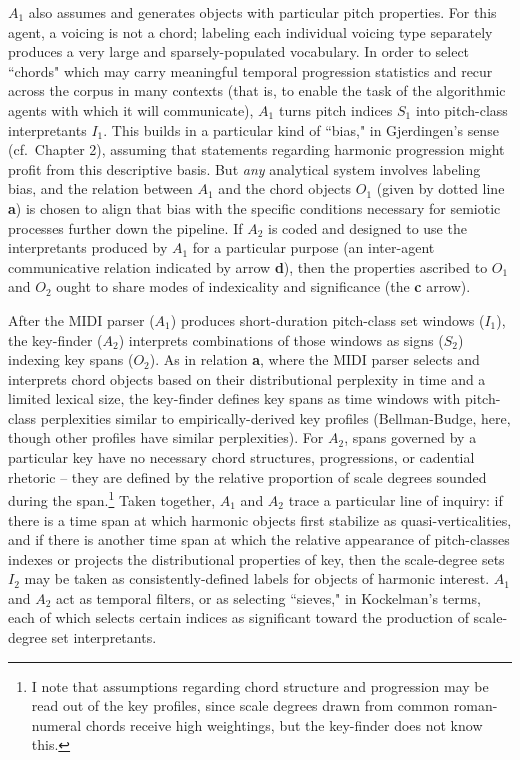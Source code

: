 $A_1$ also assumes and generates objects with particular pitch properties.  For this agent, a voicing is not a chord; labeling each individual voicing type separately produces a very large and sparsely-populated vocabulary.  In order to select ``chords"  which may carry meaningful temporal progression statistics and recur across the corpus in many contexts (that is, to enable the task of the algorithmic agents with which it will communicate), $A_1$ turns pitch indices $S_1$ into pitch-class interpretants $I_1$.  This builds in a particular kind of ``bias," in Gjerdingen's sense (cf.\ Chapter 2), assuming that statements regarding harmonic progression might profit from this descriptive basis.  But \emph{any} analytical system involves labeling bias, and the relation between $A_1$ and the chord objects $O_1$ (given by dotted line \textbf{a}) is chosen to align that bias with the specific conditions necessary for semiotic processes further down the pipeline.  If $A_2$ is coded and designed to use the interpretants produced by $A_1$ for a particular purpose (an inter-agent communicative relation indicated by arrow \textbf{d}), then the properties ascribed to $O_1$ and $O_2$ ought to share modes of indexicality and significance (the \textbf{c} arrow).

After the MIDI parser ($A_1$) produces short-duration pitch-class set windows ($I_1$), the key-finder ($A_2$) interprets combinations of those windows as signs ($S_2$) indexing key spans ($O_2$).  As in relation \textbf{a}, where the MIDI parser selects and interprets chord objects based on their distributional perplexity in time and a limited lexical size, the key-finder defines key spans as time windows with pitch-class perplexities similar to empirically-derived key profiles (Bellman-Budge, here, though other profiles have similar perplexities).  For $A_2$, spans governed by a particular key have no necessary chord structures, progressions, or cadential rhetoric -- they are defined by the relative proportion of scale degrees sounded during the span.\footnote{I note that assumptions regarding chord structure and progression may be read out of the key profiles, since scale degrees drawn from common roman-numeral chords receive high weightings, but the key-finder does not know this.}  Taken together, $A_1$ and $A_2$ trace a particular line of inquiry: if there is a time span at which harmonic objects first stabilize as quasi-verticalities, and if there is another time span at which the relative appearance of pitch-classes indexes or projects the distributional properties of key, then the scale-degree sets $I_2$ may be taken as consistently-defined labels for objects of harmonic interest.  $A_1$ and $A_2$ act as temporal filters, or as selecting ``sieves," in Kockelman's terms, each of which selects certain indices as significant toward the production of scale-degree set interpretants.

